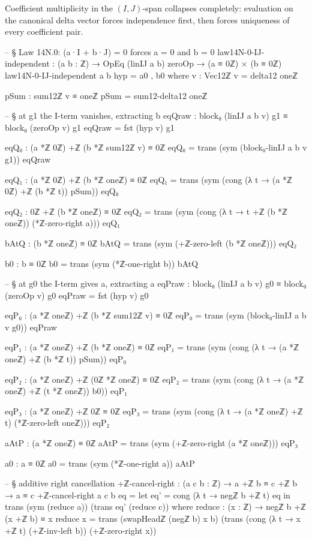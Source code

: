 \documentclass[11pt,a4paper]{book}
\begin{document}
Coefficient multiplicity in the $(I,J)$-span collapses completely:
evaluation on the canonical delta vector forces independence first,
then forces uniqueness of every coefficient pair.

\begin{code}
-- § Law 14N.0: (a·I + b·J) = 0 forces a = 0 and b = 0
law14N-0-IJ-independent : (a b : ℤ) → OpEq (linIJ a b) zeroOp → (a ≡ 0ℤ) × (b ≡ 0ℤ)
law14N-0-IJ-independent a b hyp = a0 , b0
  where
    v : Vec12ℤ
    v = delta12 oneℤ

    pSum : sum12ℤ v ≡ oneℤ
    pSum = sum12-delta12 oneℤ

    -- § at g1 the I-term vanishes, extracting b
    eqQraw : block₀ (linIJ a b v) g1 ≡ block₀ (zeroOp v) g1
    eqQraw = fst (hyp v) g1

    eqQ₀ : (a *ℤ 0ℤ) +ℤ (b *ℤ sum12ℤ v) ≡ 0ℤ
    eqQ₀ = trans (sym (block₀-linIJ a b v g1)) eqQraw

    eqQ₁ : (a *ℤ 0ℤ) +ℤ (b *ℤ oneℤ) ≡ 0ℤ
    eqQ₁ = trans (sym (cong (λ t → (a *ℤ 0ℤ) +ℤ (b *ℤ t)) pSum)) eqQ₀

    eqQ₂ : 0ℤ +ℤ (b *ℤ oneℤ) ≡ 0ℤ
    eqQ₂ =
      trans
        (sym (cong (λ t → t +ℤ (b *ℤ oneℤ)) (*ℤ-zero-right a)))
        eqQ₁

    bAtQ : (b *ℤ oneℤ) ≡ 0ℤ
    bAtQ = trans (sym (+ℤ-zero-left (b *ℤ oneℤ))) eqQ₂

    b0 : b ≡ 0ℤ
    b0 = trans (sym (*ℤ-one-right b)) bAtQ

    -- § at g0 the I-term gives a, extracting a
    eqPraw : block₀ (linIJ a b v) g0 ≡ block₀ (zeroOp v) g0
    eqPraw = fst (hyp v) g0

    eqP₀ : (a *ℤ oneℤ) +ℤ (b *ℤ sum12ℤ v) ≡ 0ℤ
    eqP₀ = trans (sym (block₀-linIJ a b v g0)) eqPraw

    eqP₁ : (a *ℤ oneℤ) +ℤ (b *ℤ oneℤ) ≡ 0ℤ
    eqP₁ = trans (sym (cong (λ t → (a *ℤ oneℤ) +ℤ (b *ℤ t)) pSum)) eqP₀

    eqP₂ : (a *ℤ oneℤ) +ℤ (0ℤ *ℤ oneℤ) ≡ 0ℤ
    eqP₂ =
      trans
        (sym (cong (λ t → (a *ℤ oneℤ) +ℤ (t *ℤ oneℤ)) b0))
        eqP₁

    eqP₃ : (a *ℤ oneℤ) +ℤ 0ℤ ≡ 0ℤ
    eqP₃ =
      trans
        (sym (cong (λ t → (a *ℤ oneℤ) +ℤ t) (*ℤ-zero-left oneℤ)))
        eqP₂

    aAtP : (a *ℤ oneℤ) ≡ 0ℤ
    aAtP = trans (sym (+ℤ-zero-right (a *ℤ oneℤ))) eqP₃

    a0 : a ≡ 0ℤ
    a0 = trans (sym (*ℤ-one-right a)) aAtP

-- § additive right cancellation
+ℤ-cancel-right : (a c b : ℤ) → a +ℤ b ≡ c +ℤ b → a ≡ c
+ℤ-cancel-right a c b eq =
  let eq' = cong (λ t → negℤ b +ℤ t) eq in
  trans
    (sym (reduce a))
    (trans eq' (reduce c))
  where
    reduce : (x : ℤ) → negℤ b +ℤ (x +ℤ b) ≡ x
    reduce x =
      trans
        (swapHeadℤ (negℤ b) x b)
        (trans
          (cong (λ t → x +ℤ t) (+ℤ-inv-left b))
          (+ℤ-zero-right x))
\end{code}
\end{document}
